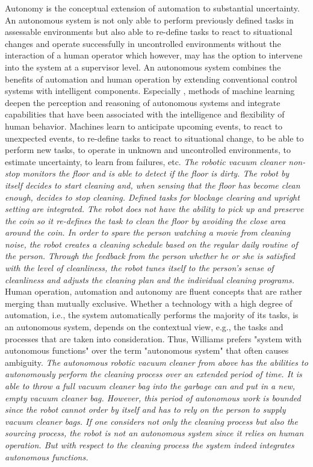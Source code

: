 Autonomy is the conceptual extension of automation to substantial uncertainty.
An autonomous system is not only able to perform previously defined tasks in assessable environments
but also able to re-define tasks to react to situational changes and operate successfully in uncontrolled environments
without the interaction of a human operator which however, may has the option to intervene into the system at a supervisor level.
An autonomous system combines the benefits of automation and human operation by extending conventional control systems with intelligent components.
Especially , methods of machine learning deepen the perception and reasoning of autonomous systems and 
integrate capabilities that have been associated with the intelligence and flexibility of human behavior.
Machines learn to anticipate upcoming events, to react to unexpected events,
to re-define tasks to react to situational change, to be able to perform new tasks,
to operate in unknown and uncontrolled environments, to estimate uncertainty, to learn from failures, etc.
\textit{The robotic vacuum cleaner non-stop monitors the floor and is able to detect if the floor is dirty.
The robot by itself decides to start cleaning and, when sensing that the floor has become clean enough, decides to stop cleaning.
Defined tasks for blockage clearing and upright setting are integrated.
The robot does not have the ability to pick up and preserve the coin so it re-defines the task to clean the floor
by avoiding the close area around the coin.
In order to spare the person watching a movie from cleaning noise, 
the robot creates a cleaning schedule based on the regular daily routine of the person.
Through the feedback from the person whether he or she is satisfied with the level of cleanliness,
the robot tunes itself to the person's sense of cleanliness and adjusts the cleaning plan and the individual cleaning programs.}
Human operation, automation and autonomy are fluent concepts that are rather merging than mutually exclusive.
Whether a technology with a high degree of automation, i.e., the system automatically performs the majority of its tasks,
is an autonomous system, depends on the contextual view, e.g., the tasks and processes that are taken into consideration.
Thus, Williams \cite{Williams} prefers "system with autonomous functions" over the term "autonomous system" that often causes ambiguity.
\textit{The autonomous robotic vacuum cleaner from above has the abilities to autonomously perform the cleaning process 
over an extended period of time.
It is able to throw a full vacuum cleaner bag into the garbage can and put in a new, empty vacuum cleaner bag. 
However, this period of autonomous work is bounded since the robot cannot order by itself and has to rely on the person 
to supply vacuum cleaner bags.
If one considers not only the cleaning process but also the sourcing process, the robot is not an autonomous system 
since it relies on human operation. 
But with respect to the cleaning process the system indeed integrates autonomous functions.}


